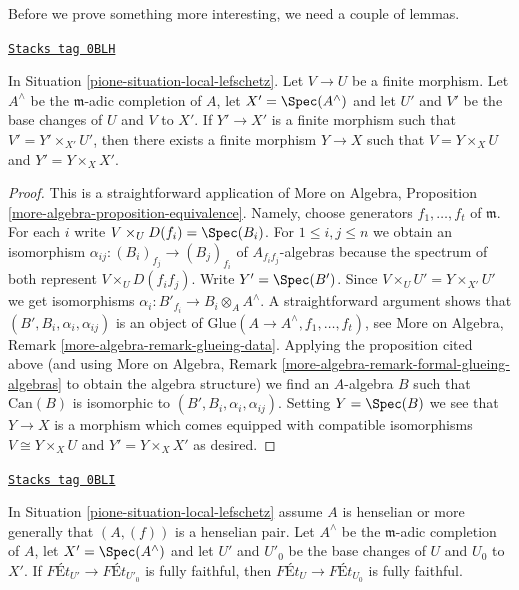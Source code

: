 Before we prove something more interesting, we need a couple of lemmas.

\begin{lemma}
\label{pione-lemma-fill-in-missing}
\href{https://stacks.math.columbia.edu/tag/0BLH}{\texttt{Stacks tag 0BLH}}

In Situation \ref{pione-situation-local-lefschetz}. Let $V \to U$ be a finite
morphism.  Let $A^\wedge$ be the $\mathfrak m$-adic completion of $A$,
let $X' = \Spec(A^\wedge)$ and let $U'$ and $V'$ be the base changes of
$U$ and $V$ to $X'$. If $Y' \to X'$ is a finite morphism such that
$V' = Y' \times_{X'} U'$, then there exists a finite morphism $Y \to X$
such that $V = Y \times_X U$ and $Y' = Y \times_X X'$.
\end{lemma}

\begin{proof}
This is a straightforward application of
More on Algebra, Proposition \ref{more-algebra-proposition-equivalence}.
Namely, choose generators $f_1, \ldots, f_t$ of $\mathfrak m$.
For each $i$ write $V \times_U D(f_i) = \Spec(B_i)$.
For $1 \leq i, j \leq n$ we obtain an isomorphism
$\alpha_{ij} : (B_i)_{f_j} \to (B_j)_{f_i}$ of $A_{f_if_j}$-algebras
because the spectrum of both represent $V \times_U D(f_if_j)$.
Write $Y' = \Spec(B')$. Since $V \times_U U' = Y \times_{X'} U'$
we get isomorphisms $\alpha_i : B'_{f_i} \to B_i \otimes_A A^\wedge$.
A straightforward argument shows that $(B', B_i, \alpha_i, \alpha_{ij})$
is an object of $\text{Glue}(A \to A^\wedge, f_1, \ldots, f_t)$, see
More on Algebra, Remark \ref{more-algebra-remark-glueing-data}.
Applying the proposition cited above (and using
More on Algebra, Remark \ref{more-algebra-remark-formal-glueing-algebras}
to obtain the algebra structure) we find an $A$-algebra $B$ such that
$\text{Can}(B)$ is isomorphic to $(B', B_i, \alpha_i, \alpha_{ij})$.
Setting $Y = \Spec(B)$ we see that $Y \to X$ is a morphism
which comes equipped with compatible isomorphisms
$V \cong Y \times_X U$ and $Y' = Y \times_X X'$ as desired.
\end{proof}

\begin{lemma}
\label{pione-lemma-fully-faithful-henselian-completion}
\href{https://stacks.math.columbia.edu/tag/0BLI}{\texttt{Stacks tag 0BLI}}

In Situation \ref{pione-situation-local-lefschetz} assume $A$ is henselian
or more generally that $(A, (f))$ is a henselian pair.
Let $A^\wedge$ be the $\mathfrak m$-adic completion of $A$,
let $X' = \Spec(A^\wedge)$ and let $U'$ and $U'_0$ be the base changes of
$U$ and $U_0$ to $X'$. If $\textit{F\'Et}_{U'} \to \textit{F\'Et}_{U'_0}$
is fully faithful, then $\textit{F\'Et}_U \to \textit{F\'Et}_{U_0}$
is fully faithful.
\end{lemma}

